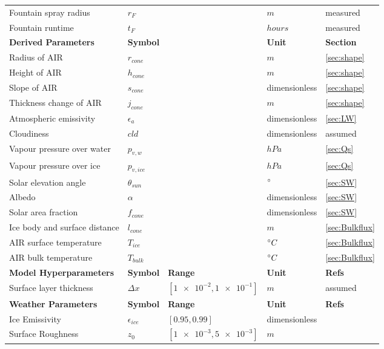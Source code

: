 \begin{table}
\begin{tabular}{lllll}
    Fountain spray radius & $r_{F}$             &             & $m$& measured \\
    Fountain runtime & $t_{F}$             &             &  $hours$ & measured \\\midrule
		\textbf{Derived Parameters} & \textbf{Symbol} & \textbf{} & \textbf{Unit} & \textbf{Section} \\
    Radius of AIR & $r_{cone}$ &  & $m$ & \ref{sec:shape}\\
    Height of AIR & $h_{cone}$ &  & $m$ & \ref{sec:shape}\\
    Slope of AIR  & $s_{cone}$ &  & dimensionless & \ref{sec:shape}\\
    Thickness change of AIR  & $j_{cone}$ &  & $m$  & \ref{sec:shape}\\
    Atmospheric emissivity & $\epsilon_{a}$ & & dimensionless    & \ref{sec:LW}\\
    Cloudiness & $cld$ &  & dimensionless  & assumed\\
    Vapour pressure over water & $p_{v,w}$ &  & $hPa$  & \ref{sec:Qs}\\
    Vapour pressure over ice & $p_{v,ice}$ &  & $hPa$ & \ref{sec:Qs}\\
    Solar elevation angle & $\theta_{sun}$ &  & $^{\circ}$ & \ref{sec:SW}\\
    Albedo & $\alpha$ &  & dimensionless & \ref{sec:SW}\\
    Solar area fraction& $f_{cone}$ &  & dimensionless & \ref{sec:SW}\\
    Ice body and surface distance & $l_{cone}$ &  & $m$  & \ref{sec:Bulkflux}\\
    AIR surface temperature & $T_{ice}$ &  & $^{\circ} C$  & \ref{sec:Bulkflux}\\
    AIR bulk temperature & $T_{bulk}$ &  & $^{\circ} C$  & \ref{sec:Bulkflux}\\\midrule
		\textbf{Model Hyperparameters} & \textbf{Symbol} & \textbf{Range} & \textbf{Unit} & \textbf{Refs} \\
    Surface layer thickness             & $\Delta x$            & $[\num{1e-2},\num{1e-1}]$           & $m$ & assumed
    \\\midrule
		\textbf{Weather Parameters} & \textbf{Symbol} & \textbf{Range} & \textbf{Unit} & \textbf{Refs} \\
    Ice Emissivity                      & $\epsilon_{ice}$      & $[0.95,0.99]$         & dimensionless & \cite{horiInsituMeasuredSpectral2006}             \\
    Surface Roughness                   & $z_0$                 & $[\num{1e-3},\num{5e-3}]$            & $m$  & \cite{brockMeasurementParameterizationAerodynamic2006}       \\

\end{tabular}
\end{table}
